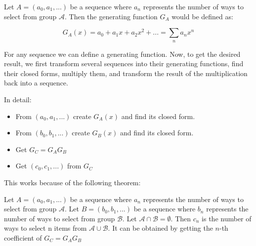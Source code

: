 Let $A = (a_0, a_1, ...)$ be a sequence where $a_n$ represents the number of ways to select from group $\mathcal{A}$. Then the generating function $G_A$ would be defined as: 

$$ G_A (x) = a_0 + a_1 x + a_2 x^2 + ... = \sum_n a_n x^n $$

For any sequence we can define a generating function. Now, to get the desired result, we first transform several sequences into their generating functions, find their closed forms, multiply them, and transform the result of the multiplication back into a sequence. 

In detail: 

\begin{itemize}
    \item From $(a_0, a_1, ...)$ create $G_A(x)$ and find its closed form.
    \item From $(b_0, b_1, ...)$ create $G_B(x)$ and find its closed form.
    \item Get $G_C = G_A G_B$
    \item Get $(c_0, c_1, ...)$ from $G_C$
\end{itemize}

This works because of the following theorem:

\begin{theorem}
    Let $A = (a_0, a_1, ...)$ be a sequence where $a_n$ represents the number of ways to select from group $\mathcal{A}$. Let $B = (b_0, b_1, ...)$ be a sequence where $b_n$ represents the number of ways to select from group $\mathcal{B}$. Let $\mathcal{A} \cap \mathcal{B} = \emptyset$. Then $c_n$ is the number of ways to select n items from $\mathcal{A} \cup \mathcal{B}$. It can be obtained by getting the $n$-th coefficient of $G_C = G_A G_B$
\end{theorem}

